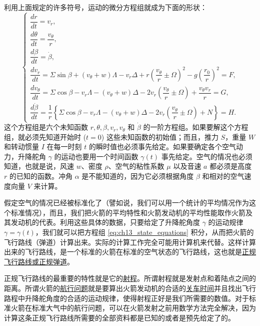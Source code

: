 利用上面规定的许多符号，运动的微分方程组就成为下面的形状：
\begin{equation}\label{eq:ch13_state_equations}
\begin{cases}
\dfrac{dr}{dt} = v_r,\\[6pt]
\dfrac{d\theta}{dt} = \dfrac{v_\theta}{r},\\[6pt]
\dfrac{d\beta}{dt} = \dot{\beta},\\[6pt]
\dfrac{dv_r}{dt} = \Sigma \sin \beta + (v_\theta + w)\Lambda - v_r \Delta + r \left( \dfrac{v_\theta}{r} \pm \Omega \right)^2 - g \left( \dfrac{r_0}{r} \right)^2 = F,\\[6pt]
\dfrac{dv_\theta}{dt} = \Sigma \cos \beta - v_r \Lambda - (v_\theta + w)\Delta - 2v_r \left( \dfrac{v_\theta}{r} \pm \Omega \right) + \dfrac{v_\theta v_r}{r} = G,\\[6pt]
\dfrac{d\dot{\beta}}{dt} = \dfrac{1}{r} \left\{ \Sigma \cos \beta - v_r \Lambda - (v_\theta + w)\Delta - 2v_r \left( \dfrac{v_\theta}{r} \pm \Omega \right) + N \right\} = H.
\end{cases}
\end{equation}
这个方程组是六个未知函数 $r, \theta, \beta, v_r, v_\theta$ 和 $\dot{\beta}$ 的一阶方程组。如果要解这个方程组，就必须先知道开始时 ($t=0$) 这些未知函数的初始值；而且，推力 $S$，重量 $W$ 和转动惯量 $I$ 在每一时刻 $t$ 的瞬时值也必须事先给定。如果要确定各个空气动力，升降舵角 $\gamma$ 的运动也要用一个时间函数 $\gamma(t)$ 事先给定。空气的情况也必须知道，也就是说，风速 $w$、密度 $\rho$、空气的粘性系数 $\mu$ 以及音速 $a$ 都必须是高度 $r$ 的已知的函数。冲角 $\alpha$ 是不能知道的，因为它必须根据角度 $\beta$ 和相对的空气速度向量 $V$ 来计算。

假定空气的情况已经被标准化了（譬如说，我们可以用一个统计的平均情况作为这个标准情况），而且，我们把火箭的平均特性和火箭发动机的平均性能取作火箭及其发动机的代表。利用这些具体的数据，只要给定了升降舵角度 $\gamma$ 的运动规律 $\gamma = \gamma(t)$，我们就可以把方程组 \eqref{eq:ch13_state_equations} 积分，从而把火箭的飞行路线（弹道）计算出来。实际的计算工作完全可能用计算机来代替。这样计算出来的飞行路线，是一个标准的火箭在标准的空气状态的飞行路线，这也就是\underline{正规飞行路线或正规弹道}。

正规飞行路线的最重要的特性就是它的\underline{射程}。所谓射程就是发射点和着陆点之间的距离。所谓火箭的\underline{航行问题}就是要算出火箭发动机的合适的\underline{关车时间}并且找出飞行路程中升降舵角度的合适的运动规律，使得射程正好是我们所需要的数值。对于标准火箭在标准大气中的航行问题，可以在火箭发射之前用数学方法完全解决，因为计算这条正规飞行路线所需要的全部资料都是已知的或者是预先给定了的。

